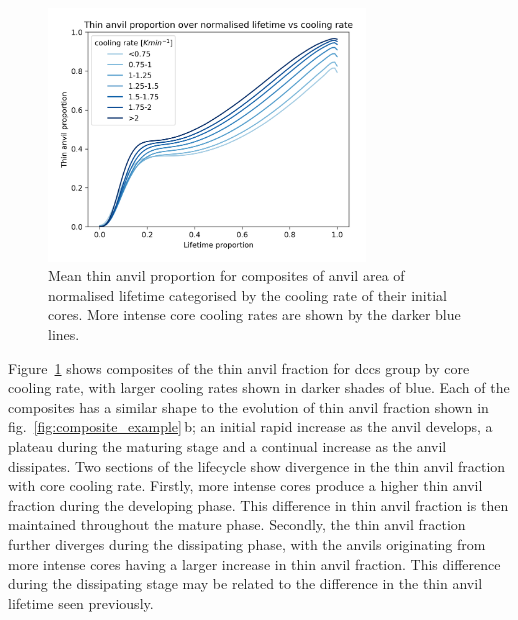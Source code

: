\begin{figure}[tp]
    \centering
    \includegraphics[width=0.75\textwidth]{figures/chapter3_13.png}
    \caption[
    Mean thin anvil proportion for composites of anvil area of normalised lifetime categorised by the cooling rate of their initial cores.
    ]{
    Mean thin anvil proportion for composites of anvil area of normalised lifetime categorised by the cooling rate of their initial cores. More intense core cooling rates are shown by the darker blue lines.
    }
    \label{fig:cooling_rate_composite}
\end{figure}


Figure~\ref{fig:cooling_rate_composite} shows composites of the thin anvil fraction for \acrshort{dcc}s group by core cooling rate, with larger cooling rates shown in darker shades of blue.
Each of the composites has a similar shape to the evolution of thin anvil fraction shown in fig.~\ref{fig:composite_example}\,b; an initial rapid increase as the anvil develops, a plateau during the maturing stage and a continual increase as the anvil dissipates.
Two sections of the lifecycle show divergence in the thin anvil fraction with core cooling rate.
Firstly, more intense cores produce a higher thin anvil fraction during the developing phase.
This difference in thin anvil fraction is then maintained throughout the mature phase.
Secondly, the thin anvil fraction further diverges during the dissipating phase, with the anvils originating from more intense cores having a larger increase in thin anvil fraction.
This difference during the dissipating stage may be related to the difference in the thin anvil lifetime seen previously.


